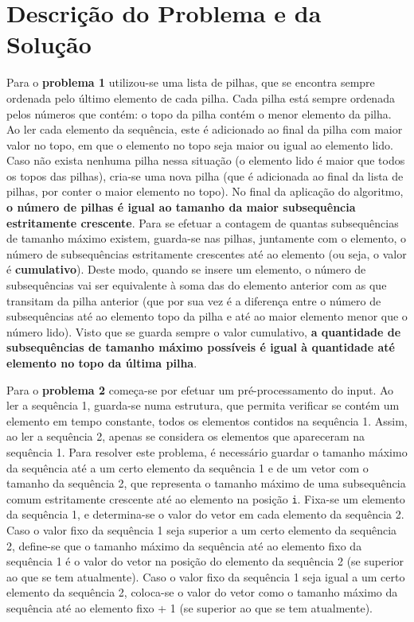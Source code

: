 \documentclass[12pt,a4paper]{article}
\begin{document}
  \section{Descrição do Problema e da Solução}

  Para o \textbf{problema 1} utilizou-se uma lista de pilhas, que se encontra sempre ordenada pelo último elemento de cada pilha.
  Cada pilha está sempre ordenada pelos números que contém: o topo da pilha contém o menor elemento da pilha.
  Ao ler cada elemento da sequência, este é adicionado ao final da pilha com maior valor no topo, em que o elemento no topo seja maior ou igual ao elemento lido.
  Caso não exista nenhuma pilha nessa situação (o elemento lido é maior que todos os topos das pilhas), cria-se uma nova pilha (que é adicionada ao final da lista de pilhas, por conter o maior elemento no topo).
  No final da aplicação do algoritmo, \textbf{o número de pilhas é igual ao tamanho da maior subsequência estritamente crescente}. \cite{aldous-1999}
  Para se efetuar a contagem de quantas subsequências de tamanho máximo existem, guarda-se nas pilhas, juntamente com o elemento, o número de subsequências estritamente crescentes até ao elemento (ou seja, o valor é \textbf{cumulativo}).
  Deste modo, quando se insere um elemento, o número de subsequências vai ser equivalente à soma das do elemento anterior com as que transitam da pilha anterior (que por sua vez é a diferença entre o número de subsequências até ao elemento topo da pilha e até ao maior elemento menor que o número lido).
  Visto que se guarda sempre o valor cumulativo, \textbf{a quantidade de subsequências de tamanho máximo possíveis é igual à quantidade até elemento no topo da última pilha}.

  Para o \textbf{problema 2} começa-se por efetuar um pré-processamento do input.
  Ao ler a sequência 1, guarda-se numa estrutura, que permita verificar se contém um elemento em tempo constante, todos os elementos contidos na sequência 1.
  Assim, ao ler a sequência 2, apenas se considera os elementos que apareceram na sequência 1.
  Para resolver este problema, é necessário guardar o tamanho máximo da sequência até a um certo elemento da sequência 1 e de um vetor com o tamanho da sequência 2, que representa o tamanho máximo de uma subsequência comum estritamente crescente até ao elemento na posição \texttt{i}.
  Fixa-se um elemento da sequência 1, e determina-se o valor do vetor em cada elemento da sequência 2.
  Caso o valor fixo da sequência 1 seja superior a um certo elemento da sequência 2, define-se que o tamanho máximo da sequência até ao elemento fixo da sequência 1 é o valor do vetor na posição do elemento da sequência 2 (se superior ao que se tem atualmente).
  Caso o valor fixo da sequência 1 seja igual a um certo elemento da sequência 2, coloca-se o valor do vetor como o tamanho máximo da sequência até ao elemento fixo + 1 (se superior ao que se tem atualmente). \cite{DBLP:journals/corr/Zhu0WW16}
\end{document}
